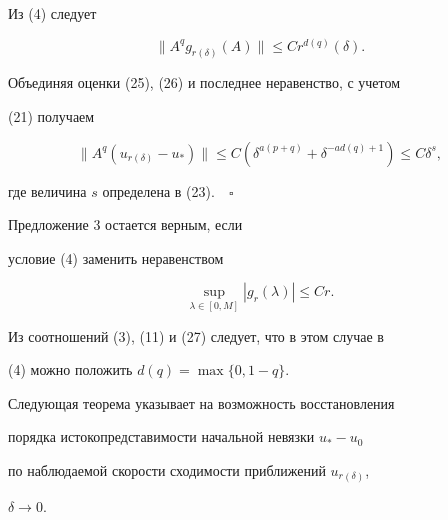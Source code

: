 Из (4) следует


$$ 


\|A^q g_{r(\delta)}(A)\|\le C r^{d(q)}(\delta). 


$$ 


Объединяя оценки (25), (26) и последнее неравенство, с учетом 


(21) получаем 


$$ 


\|A^q(u_{r(\delta)}-u_*)\|\le C 


(\delta^{a(p+q)}+\delta^{-a d(q)+1})\le C\delta^s, 


$$ 


где величина $s$ определена в (23).$\quad\square$ 


 


\begin{note} 


Предложение 3 остается верным, если 


условие (4) заменить неравенством 


\begin{equation} 


\sup_{\lambda\in[0,M]}|g_r(\lambda)|\le C r. 


\end{equation} 


Из соотношений (3), (11) и (27) следует, что в этом случае в 


(4) можно положить $d(q)=\max\{0,1-q\}$. 


\end{note} 


 


Следующая теорема указывает на возможность восстановления 


порядка истокопредставимости начальной невязки $u_*-u_0$ 


по наблюдаемой скорости сходимости приближений $u_{r(\delta)}$, 


$\delta\to0$. 


 


